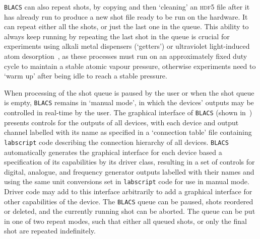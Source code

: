 \texttt{BLACS} can also repeat shots, by copying and then `cleaning' an \textsc{hdf5} file after it has already run to produce a new shot file ready to be run on the hardware. It can repeat either all the shots, or just the last one in the queue. This ability to always keep running by repeating the last shot in the queue is crucial for experiments using alkali metal dispensers (`getters') or ultraviolet light-induced atom desorption~\cite{klempt_ultraviolet_2006}, as these processes must run on an approximately fixed duty cycle to maintain a stable atomic vapour pressure, otherwise experiments need to `warm up' after being idle to reach a stable pressure.

When processing of the shot queue is paused by the user or when the shot queue is empty, \texttt{BLACS} remains in `manual mode', in which the devices' outputs may be controlled in real-time by the user. The graphical interface of \texttt{BLACS} (shown in~) presents controls for the outputs of all devices, with each device and output channel labelled with its name as specified in a `connection table' file containing \texttt{labscript} code describing the connection hierarchy of all devices. \texttt{BLACS} automatically generates the graphical interface for each device based a specification of its capabilities by its driver class, resulting in a set of controls for digital, analogue, and frequency generator outputs labelled with their names and using the same unit conversions set in \texttt{labscript} code for use in manual mode. Driver code may add to this interface arbitrarily to add a graphical interface for other capabilities of the device. The \texttt{BLACS} queue can be paused, shots reordered or deleted, and the currently running shot can be aborted. The queue can be put in one of two repeat modes, such that either all queued shots, or only the final shot are repeated indefinitely.

